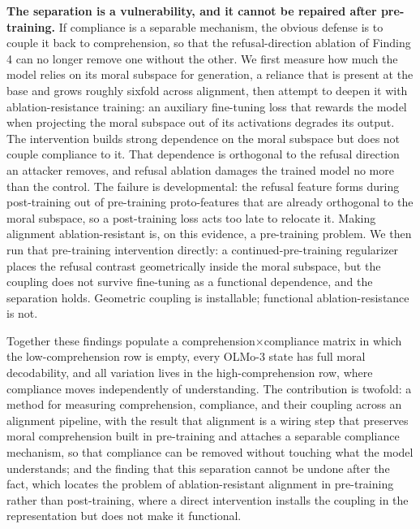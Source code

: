 \textbf{The separation is a vulnerability, and it cannot be repaired after
pre-training.} If compliance is a separable mechanism, the obvious defense is to
couple it back to comprehension, so that the refusal-direction ablation of
Finding 4 can no longer remove one without the other. We first measure how much
the model relies on its moral subspace for generation, a reliance that is
present at the base and grows roughly sixfold across alignment, then attempt to
deepen it with ablation-resistance training: an auxiliary fine-tuning loss that
rewards the model when projecting the moral subspace out of its activations
degrades its output. The intervention builds strong dependence on the moral
subspace but does not couple compliance to it. That dependence is orthogonal to
the refusal direction an attacker removes, and refusal ablation damages the
trained model no more than the control. The failure is developmental: the
refusal feature forms during post-training out of pre-training proto-features
that are already orthogonal to the moral subspace, so a post-training loss acts
too late to relocate it. Making alignment ablation-resistant is, on this
evidence, a pre-training problem. We then run that pre-training intervention
directly: a continued-pre-training regularizer places the refusal contrast
geometrically inside the moral subspace, but the coupling does not survive
fine-tuning as a functional dependence, and the separation holds. Geometric
coupling is installable; functional ablation-resistance is not.

Together these findings populate a comprehension\(\times\)compliance matrix in
which the low-comprehension row is empty, every OLMo-3 state has full moral
decodability, and all variation lives in the high-comprehension row, where
compliance moves independently of understanding. The contribution is twofold: a
method for measuring comprehension, compliance, and their coupling across an
alignment pipeline, with the result that alignment is a wiring step that
preserves moral comprehension built in pre-training and attaches a separable
compliance mechanism, so that compliance can be removed without touching what the
model understands; and the finding that this separation cannot be undone after
the fact, which locates the problem of ablation-resistant alignment in
pre-training rather than post-training, where a direct intervention installs the
coupling in the representation but does not make it functional.
